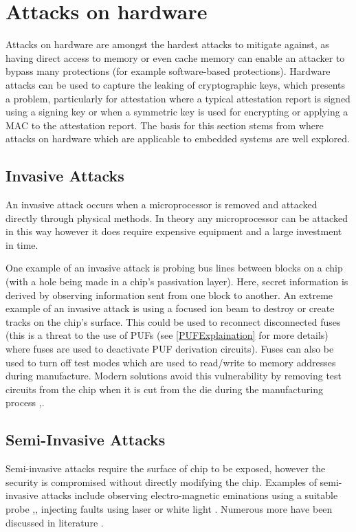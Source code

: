 \UseRawInputEncoding
\section{Attacks on hardware} \label{hardwareAttacks}

Attacks on hardware are amongst the hardest attacks to mitigate against, as having direct access to memory or even cache memory can enable an attacker to bypass many protections (for example software-based protections). Hardware attacks can be used to capture the leaking of cryptographic keys, which presents a problem, particularly for attestation where a typical attestation report is signed using a signing key or when a symmetric key is used for encrypting or applying a MAC to the attestation report. The basis for this section stems from \cite{MayesKeithE2008SCTS} where attacks on hardware which are applicable to embedded systems are well explored.

\subsection{Invasive Attacks}
An invasive attack occurs when a microprocessor is removed and attacked directly through physical methods. In theory any microprocessor can be attacked in this way however it does require expensive equipment and a large investment in time.

One example of an invasive attack is probing bus lines between blocks on a chip (with a hole being made in a chip's passivation layer). Here, secret information is derived by observing information sent from one block to another. An extreme example of an invasive attack is using a focused ion beam to destroy or create tracks on the chip's surface. This could be used to reconnect disconnected fuses (this is a threat to the use of PUFs (see \ref{PUFExplaination} for more details) where fuses are used to deactivate PUF derivation circuits). Fuses can also be used to turn off test modes which are used to read\slash write to memory addresses during manufacture. Modern solutions avoid this vulnerability by removing test circuits from the chip when it is cut from the die during the manufacturing process \cite{Anderson1996},\cite{Kommerling1999}.

\subsection{Semi-Invasive Attacks}

Semi-invasive attacks  require the surface of chip to be exposed, however the security is compromised without directly modifying the chip. Examples of semi-invasive attacks include observing electro-magnetic eminations using a suitable probe \cite{Gandolfi2007},\cite{Quisquater2001}, injecting faults using laser \cite{Bar-el2006} or white light \cite{Skorobogatov2007}. Numerous more have been discussed in literature \cite{Skorobogatov2005}.

